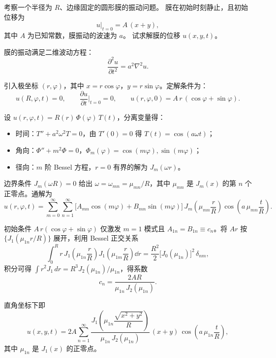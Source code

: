 \begin{question}[圆形膜的振动]

考察一个半径为 $R$、边缘固定的圆形膜的振动问题。
膜在初始时刻静止，且初始位移为
\[
u\big|_{t=0} = A\,(x + y),
\]
其中 $A$ 为已知常数，膜振动的波速为 $a$。
试求解膜的位移 $u(x,y,t)$。

\begin{solution}

膜的振动满足二维波动方程：
\[
\frac{\partial^{2} u}{\partial t^{2}} = a^{2} \nabla^{2} u.
\]

引入极坐标 $(r,\varphi)$，其中 $x = r\cos\varphi$，$y = r\sin\varphi$。定解条件为：
\[
u(R,\varphi,t) = 0,\qquad
\frac{\partial u}{\partial t}\Big|_{t=0} = 0,\qquad
u(r,\varphi,0) = A\,r\,(\cos\varphi + \sin\varphi).
\]

设 $u(r,\varphi,t) = R(r)\,\Phi(\varphi)\,T(t)$，分离变量得：
\begin{itemize}
  \item 时间：$T'' + a^{2}\omega^{2} T = 0$，由 $T'(0)=0$ 得 $T(t)=\cos(a\omega t)$；
  \item 角向：$\Phi''+m^{2}\Phi=0$，$\Phi_m(\varphi)=\cos(m\varphi),\sin(m\varphi)$；
  \item 径向：$m$ 阶 Bessel 方程，$r=0$ 有界的解为 $J_{m}(\omega r)$。
\end{itemize}

边界条件 $J_{m}(\omega R)=0$ 给出 $\omega = \omega_{mn} = \mu_{mn}/R$，其中 $\mu_{mn}$ 是 $J_{m}(x)$ 的第 $n$ 个正零点。通解为
\[
u(r,\varphi,t) = \sum_{m=0}^{\infty}\sum_{n=1}^{\infty}
\bigl[A_{mn}\cos(m\varphi) + B_{mn}\sin(m\varphi)\bigr]\,
J_{m}\!\left(\mu_{mn}\frac{r}{R}\right)
\cos\!\left(a\,\mu_{mn}\frac{t}{R}\right).
\]

初始条件 $A\,r(\cos\varphi+\sin\varphi)$ 仅激发 $m=1$ 模式且 $A_{1n}=B_{1n}\equiv c_n$。将 $Ar$ 按 $\{J_{1}(\mu_{1n}r/R)\}$ 展开，利用 Bessel 正交关系
\[
\int_{0}^{R} r\,J_{1}\!\left(\mu_{1n}\frac{r}{R}\right)
J_{1}\!\left(\mu_{1m}\frac{r}{R}\right)\dd r
= \frac{R^{2}}{2}\bigl[J_{0}(\mu_{1n})\bigr]^{2}\,\delta_{nm},
\]
积分可得 $\int r^{2}J_{1}\,dr = R^{3}J_{2}(\mu_{1n})/\mu_{1n}$，得系数
\[
c_{n} = \frac{2AR}{\mu_{1n}\,J_{2}(\mu_{1n})}.
\]


直角坐标下即
\[
u(x,y,t) = 2A\sum_{n=1}^{\infty}
\frac{J_{1}\!\left(\mu_{1n}\dfrac{\sqrt{x^{2}+y^{2}}}{R}\right)}
{\mu_{1n}\,J_{2}(\mu_{1n})}\,
(x + y)\,
\cos\!\left(a\,\mu_{1n}\frac{t}{R}\right),
\]
其中 $\mu_{1n}$ 是 $J_{1}(x)$ 的正零点。

\end{solution}
\end{question}

